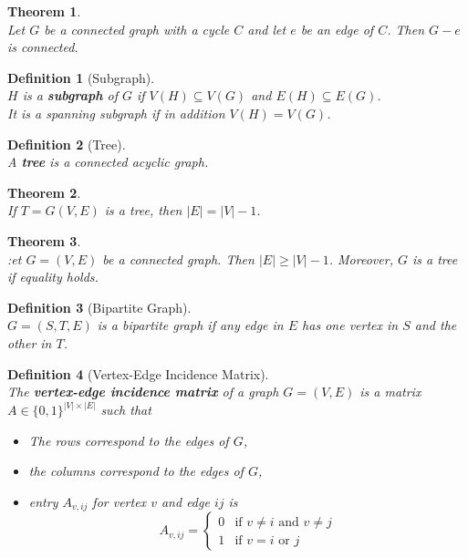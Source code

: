 \documentclass[12pt]{article}
\newtheorem{definition}{Definition}[section]
\newtheorem{theorem}{Theorem}[section]
\theoremstyle{definition}
\begin{document}
\begin{theorem}
\hfill\\\normalfont Let $G$ be a connected graph with a cycle $C$ and let $e$ be an edge of $C$. Then $G-e$ is connected.
\end{theorem}
\begin{definition}[Subgraph]
\hfill\\\normalfont $H$ is a \textbf{subgraph} of $G$ if $V(H)\subseteq V(G)$ and $E(H)\subseteq E(G)$. \\
It is a spanning subgraph if in addition $V(H) = V(G)$.
\end{definition}
\begin{definition}[Tree]
\hfill\\\normalfont A \textbf{tree} is a connected acyclic graph.
\end{definition}
\begin{theorem}
\hfill\\\normalfont If $T=G(V,E)$ is a tree, then $|E|= |V|-1$.
\end{theorem}
\begin{theorem}
\hfill\\\normalfont :et $G=(V,E)$ be a connected graph. Then $|E|\geq |V|-1$. Moreover, $G$ is a tree if equality holds.
\end{theorem}
\begin{definition}[Bipartite Graph]
\hfill\\\normalfont $G=(S,T,E)$ is a bipartite graph if any edge in $E$ has one vertex in $S$ and the other in $T$.
\end{definition}
\begin{definition}[Vertex-Edge Incidence Matrix]
\hfill\\\normalfont The \textbf{vertex-edge incidence matrix} of a graph $G=(V,E)$ is a matrix $A\in \{0,1\}^{|V|\times|E|}$ such that
\begin{itemize}
\item The rows correspond to the edges of $G$,
\item the columns correspond to the edges of $G$,
\item entry $A_{v,ij}$ for vertex $v$ and edge $ij$ is
\[
A_{v,ij} = \begin{cases}
0&\text{if }v\neq i\text{ and }v\neq j\\
1&\text{if }v=i\text{ or }j
\end{cases}
\] 
\end{itemize}
\end{definition}
\end{document}
